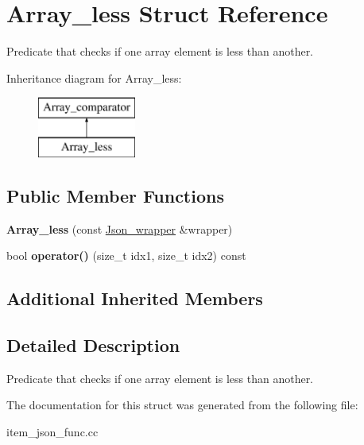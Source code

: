 \hypertarget{structArray__less}{}\section{Array\+\_\+less Struct Reference}
\label{structArray__less}


Predicate that checks if one array element is less than another.  


Inheritance diagram for Array\+\_\+less\+:\begin{figure}[H]
\begin{center}
\leavevmode
\includegraphics[height=2.000000cm]{structArray__less}
\end{center}
\end{figure}
\subsection*{Public Member Functions}
\begin{DoxyCompactItemize}
\item 
\mbox{\label{structArray__less_a9dc397bd82068c05d72325d6675e9f47}} 
{\bfseries Array\+\_\+less} (const \mbox{\hyperlink{classJson__wrapper}{Json\+\_\+wrapper}} \&wrapper)
\item 
\mbox{\label{structArray__less_a04923b02020c12037577fbfb2ed3a036}} 
bool {\bfseries operator()} (size\+\_\+t idx1, size\+\_\+t idx2) const
\end{DoxyCompactItemize}
\subsection*{Additional Inherited Members}


\subsection{Detailed Description}
Predicate that checks if one array element is less than another. 

The documentation for this struct was generated from the following file\+:\begin{DoxyCompactItemize}
\item 
item\+\_\+json\+\_\+func.\+cc\end{DoxyCompactItemize}
